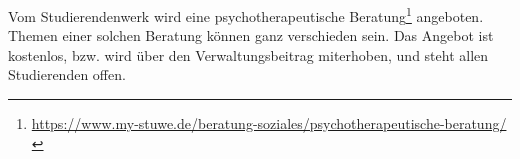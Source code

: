 Vom Studierendenwerk wird eine psychotherapeutische Beratung\footnote{\url{https://www.my-stuwe.de/beratung-soziales/psychotherapeutische-beratung/}} angeboten. Themen einer solchen Beratung können ganz verschieden sein. Das Angebot ist kostenlos, bzw. wird über den Verwaltungsbeitrag miterhoben, und steht allen Studierenden offen.